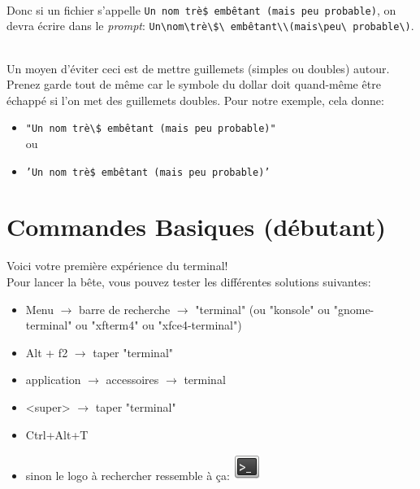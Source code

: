 \documentclass[french, a4paper, 12pt, titlepage]{article}
\begin{document}
\paragraph{} Donc si un fichier s'appelle \texttt{Un nom trè\$ embêtant (mais
peu probable)}, on devra écrire dans le \emph{prompt}:
\texttt{Un\textbackslash{\textvisiblespace}nom\textbackslash{\textvisiblespace}trè\textbackslash\$\textbackslash\textvisiblespace
embêtant\textbackslash{\textvisiblespace}\textbackslash(mais\textbackslash{\textvisiblespace}peu\textbackslash
probable\textbackslash)}.

\paragraph{} Un moyen d'éviter ceci est de mettre guillemets (simples ou
doubles) autour. Prenez garde tout de même car le symbole du dollar doit
quand-même être échappé si l'on met des guillemets doubles. Pour notre exemple,
cela donne:
\\
\begin{itemize}
	\item \texttt{"Un nom trè\textbackslash\$ embêtant (mais peu probable)"}\\
	ou
	\item \texttt{'Un nom trè\$ embêtant (mais peu probable)'}
\end{itemize}

\part{Commandes Basiques (débutant)}

Voici votre première expérience du terminal!\\
Pour lancer la bête, vous pouvez tester les différentes solutions suivantes:
\begin{itemize}
	\item Menu $\rightarrow$ barre de recherche $\rightarrow$ "terminal" (ou
		"konsole" ou "gnome-terminal" ou "xfterm4" ou "xfce4-terminal")
	\item Alt + f2 $\rightarrow$ taper "terminal"
	\item application $\rightarrow$ accessoires $\rightarrow$ terminal
	\item <super> $\rightarrow$ taper "terminal"
	\item Ctrl+Alt+T
	\item sinon le logo à rechercher ressemble à ça:
		\includegraphics[scale=0.7]{Images/termIcon}
\end{itemize}
\end{document}
